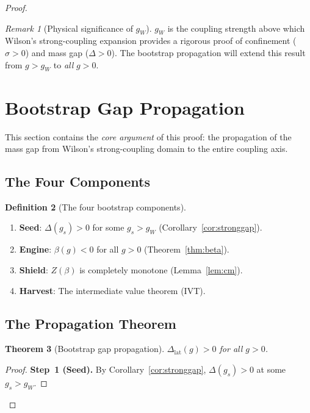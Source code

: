 \documentclass[12pt,a4paper]{article}
\theoremstyle{plain}
\newtheorem{theorem}{Theorem}[section]
\theoremstyle{definition}
\newtheorem{definition}[theorem]{Definition}
\theoremstyle{remark}
\newtheorem{remark}[theorem]{Remark}
\begin{document}
\begin{proof}
\begin{remark}[Physical significance of $g_W$]
$g_W$ is the coupling strength above which Wilson's strong-coupling expansion provides a rigorous proof of confinement ($\sigma>0$) and mass gap ($\Delta>0$). The bootstrap propagation will extend this result from $g>g_W$ to \emph{all} $g>0$.
\end{remark}

\section{Bootstrap Gap Propagation}\label{sec:bootstrap}

This section contains the \emph{core argument} of this proof: the propagation of the mass gap from Wilson's strong-coupling domain to the entire coupling axis.

\subsection{The Four Components}\label{sec:components}

\begin{definition}[The four bootstrap components]\label{def:bootstrap}
\begin{enumerate}[label=(\roman*)]
\item \textbf{Seed}: $\Delta(g_s)>0$ for some $g_s>g_W$ (Corollary~\ref{cor:stronggap}).
\item \textbf{Engine}: $\beta(g)<0$ for all $g>0$ (Theorem~\ref{thm:beta}).
\item \textbf{Shield}: $Z(\beta)$ is completely monotone (Lemma~\ref{lem:cm}).
\item \textbf{Harvest}: The intermediate value theorem (IVT).
\end{enumerate}
\end{definition}

\subsection{The Propagation Theorem}\label{sec:propagation}

\begin{theorem}[Bootstrap gap propagation]\label{thm:bootstrap}
$\Delta_{\mathrm{lat}}(g)>0$ for all $g>0$.
\end{theorem}

\begin{proof}
\textbf{Step~1 (Seed).} By Corollary~\ref{cor:stronggap}, $\Delta(g_s)>0$ at some $g_s>g_W$.


\end{proof}
\end{proof}
\end{document}
